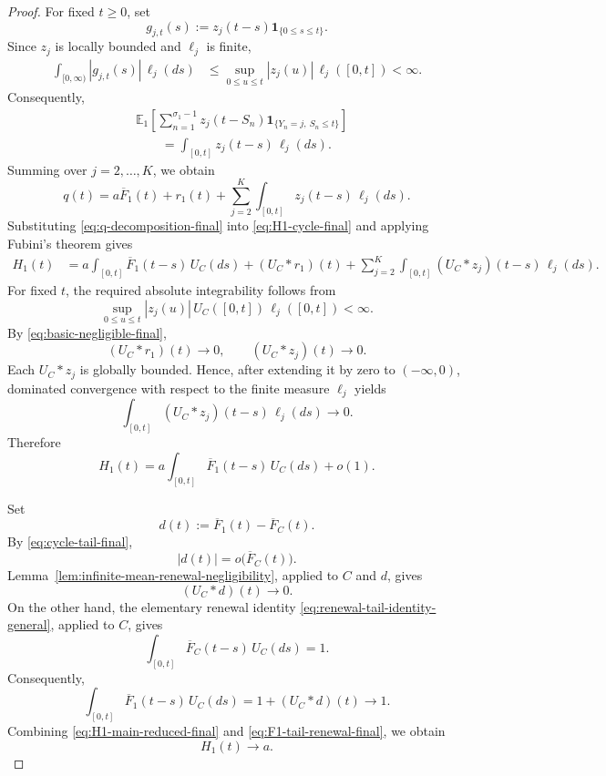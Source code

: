\documentclass[reqno,final,11pt]{amsart}
\newcommand{\E}{\mathbb E}
\newcommand{\ind}[1]{\mathbf 1_{\{#1\}}}
\theoremstyle{plain}
\theoremstyle{definition}
\theoremstyle{remark}
\numberwithin{equation}{section}
\begin{document}
\begin{proof}
For fixed \(t\ge0\), set
\[
  g_{j,t}(s)
  :=
  z_j(t-s)\ind{0\le s\le t}.
\]
Since \(z_j\) is locally bounded and \(\ell_j\) is finite,
\[
\begin{split}
  \int_{[0,\infty)}|g_{j,t}(s)|\,\ell_j(ds)
  &\le
  \sup_{0\le u\le t}|z_j(u)|\,
  \ell_j([0,t])
  <\infty.
\end{split}
\]
Consequently,
\[
\begin{split}
  &\E_1\left[
    \sum_{n=1}^{\sigma_1-1}
    z_j(t-S_n)\ind{Y_n=j,\ S_n\le t}
  \right]\\
  &\qquad=
  \int_{[0,t]}z_j(t-s)\,\ell_j(ds).
\end{split}
\]
Summing over \(j=2,\dots,K\), we obtain
\begin{equation}\label{eq:q-decomposition-final}
  q(t)
  =
  a\overline F_1(t)+r_1(t)
  +
  \sum_{j=2}^K
  \int_{[0,t]}z_j(t-s)\,\ell_j(ds).
\end{equation}
Substituting \eqref{eq:q-decomposition-final} into \eqref{eq:H1-cycle-final} and applying Fubini's theorem gives
\begin{equation}\label{eq:H1-conv-decomp-final}
\begin{split}
  H_1(t)
  &=
  a\int_{[0,t]}\overline F_1(t-s)\,U_C(ds)
  +(U_C*r_1)(t)+
  \sum_{j=2}^K
  \int_{[0,t]}(U_C*z_j)(t-s)\,\ell_j(ds).
\end{split}
\end{equation}
For fixed \(t\), the required absolute integrability follows from
\[
  \sup_{0\le u\le t}|z_j(u)|\,
  U_C([0,t])\,\ell_j([0,t])
  <\infty.
\]
By \eqref{eq:basic-negligible-final},
\[
  (U_C*r_1)(t)\longrightarrow0,
  \qquad
  (U_C*z_j)(t)\longrightarrow0.
\]
Each \(U_C*z_j\) is globally bounded. Hence, after extending it by zero to \((-\infty,0)\), dominated convergence with respect to the finite measure \(\ell_j\) yields
\[
  \int_{[0,t]}(U_C*z_j)(t-s)\,\ell_j(ds)
  \longrightarrow0.
\]
Therefore
\begin{equation}\label{eq:H1-main-reduced-final}
  H_1(t)
  =
  a\int_{[0,t]}\overline F_1(t-s)\,U_C(ds)+o(1).
\end{equation}

Set
\[
  d(t):=\overline F_1(t)-\overline F_C(t).
\]
By \eqref{eq:cycle-tail-final},
\[
  |d(t)|=o\bigl(\overline F_C(t)\bigr).
\]
Lemma~\ref{lem:infinite-mean-renewal-negligibility}, applied to \(C\) and \(d\), gives
\[
  (U_C*d)(t)\longrightarrow0.
\]
On the other hand, the elementary renewal identity \eqref{eq:renewal-tail-identity-general}, applied to \(C\), gives
\[
  \int_{[0,t]}\overline F_C(t-s)\,U_C(ds)=1.
\]
Consequently,
\begin{equation}\label{eq:F1-tail-renewal-final}
  \int_{[0,t]}\overline F_1(t-s)\,U_C(ds)
  =
  1+(U_C*d)(t)
  \longrightarrow1.
\end{equation}
Combining \eqref{eq:H1-main-reduced-final} and \eqref{eq:F1-tail-renewal-final}, we obtain
\[
  H_1(t)\longrightarrow a.
\]



\end{proof}
\end{document}
